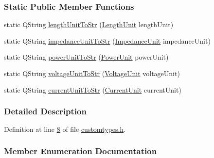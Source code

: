 \subsubsection*{Static Public Member Functions}
\begin{DoxyCompactItemize}
\item 
static Q\+String \hyperlink{class_unit_abd363319f79f97b0a0b9a08c5ddc3cdb}{length\+Unit\+To\+Str} (\hyperlink{class_unit_a8c8921f7b225ad6063b1cb573425b9a0}{Length\+Unit} length\+Unit)
\item 
static Q\+String \hyperlink{class_unit_ae3ca20f4b6530f04ca6aa138ec0fa7d2}{impedance\+Unit\+To\+Str} (\hyperlink{class_unit_a3747e779c805df24a71961290be3fbdf}{Impedance\+Unit} impedance\+Unit)
\item 
static Q\+String \hyperlink{class_unit_ad1487441b5a7eb93a3eb0aeebe947725}{power\+Unit\+To\+Str} (\hyperlink{class_unit_ace265ae255370ccacfd5370337572c3b}{Power\+Unit} power\+Unit)
\item 
static Q\+String \hyperlink{class_unit_a7fa103c31f9f069961b35b6371ff0c0a}{voltage\+Unit\+To\+Str} (\hyperlink{class_unit_a55b07dfa9457e1eca2c7194fe0cfc3c1}{Voltage\+Unit} voltage\+Unit)
\item 
static Q\+String \hyperlink{class_unit_a7bd3ed3edcb18170cd162d384075b651}{current\+Unit\+To\+Str} (\hyperlink{class_unit_a0794cf6c9682f48296dd4a5315389787}{Current\+Unit} current\+Unit)
\end{DoxyCompactItemize}


\subsubsection{Detailed Description}


Definition at line \hyperlink{customtypes_8h_source_l00008}{8} of file \hyperlink{customtypes_8h_source}{customtypes.\+h}.



\subsubsection{Member Enumeration Documentation}
\hypertarget{class_unit_a0794cf6c9682f48296dd4a5315389787}{}
